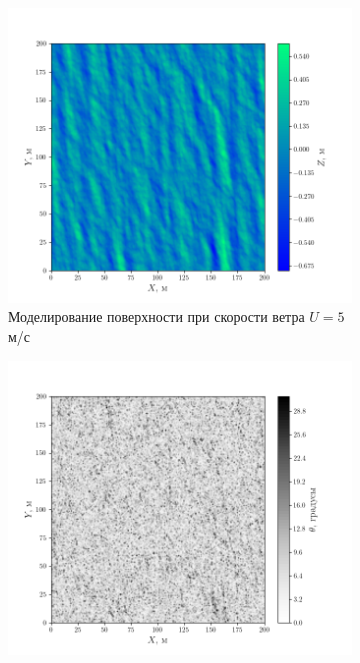 \begin{figure}[h!]
    \centering
    \begin{subfigure}{0.65\linewidth}
        \centering
        \includegraphics[width=\linewidth]{fig/impulse/fig1}
        \caption{Моделирование поверхности при скорости ветра $U=5$ м/с}
        \label{fig:mirror:a}
    \end{subfigure}
    \begin{subfigure}{.49\linewidth}
        \centering
        \includegraphics[width=\linewidth]{fig/impulse/fig2}

\end{subfigure}
\end{figure}
